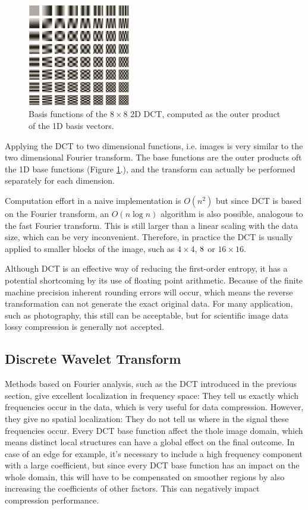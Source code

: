 \documentclass{diploma_style}
\begin{document}
\begin{figure}
\centering
\includegraphics[width=0.4\textwidth]{figures/3_compression/DCT_bases}
\caption{Basis functions of the $8 \times 8$ 2D DCT, computed as the outer product of the 1D basis vectors.}
\label{fig:DCT_bases}
\end{figure}

Applying the DCT to two dimensional functions, i.e. images is very similar to the two dimensional Fourier transform. The base functions are the outer products oft the 1D base functions (Figure \ref{fig:DCT_bases}.), and the transform can actually be performed separately for each dimension.

Computation effort in a naive implementation is $O(n^2)$ but since DCT is based on the Fourier transform, an $O(n \log n)$ algorithm is also possible, analogous to the fast Fourier transform. This is still larger than a linear scaling with the data size, which can be very inconvenient. Therefore, in practice the DCT is usually applied to smaller blocks of the image, such as $4\times4$, $8\time8$ or $16\times16$. 

Although DCT is an effective way of reducing the first-order entropy, it has a potential shortcoming by its use of floating point arithmetic. Because of the finite machine precision inherent rounding errors will occur, which means the reverse transformation can not generate the exact original data. For many application, such as photography, this still can be acceptable, but for scientific image data lossy compression is generally not accepted.


\subsection{Discrete Wavelet Transform}
Methods based on Fourier analysis, such as the DCT introduced in the previous section, give excellent localization in frequency space: They tell us exactly which frequencies occur in the data, which is very useful for data compression. However, they give no spatial localization: They do not tell us where in the signal these frequencies occur. Every DCT base function affect the thole image domain, which means distinct local structures can have a global effect on the final outcome. In case of an edge for example, it's necessary to include a high frequency component with a large coefficient, but since every DCT base function has an impact on the whole domain, this will have to be compensated on smoother regions by also increasing the coefficients of other factors. This can negatively impact compression performance.
\end{document}
